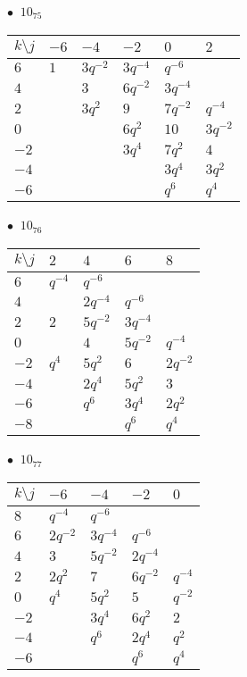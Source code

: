 %
\begin{minipage}{\linewidth}
$\bullet\ $ $10_{75}$ \vspace{0.5em} \\
\begin{tabular}{l|lllll}
$k \setminus j$ & $-6$ & $-4$ & $-2$ & $0$ & $2$ \\
\hline
$6$ & $1$ & $3q^{-2}$ & $3q^{-4}$ & $q^{-6}$ &  \\
$4$ &  & $3$ & $6q^{-2}$ & $3q^{-4}$ &  \\
$2$ &  & $3q^{2}$ & $9$ & $7q^{-2}$ & $q^{-4}$ \\
$0$ &  &  & $6q^{2}$ & $10$ & $3q^{-2}$ \\
$-2$ &  &  & $3q^{4}$ & $7q^{2}$ & $4$ \\
$-4$ &  &  &  & $3q^{4}$ & $3q^{2}$ \\
$-6$ &  &  &  & $q^{6}$ & $q^{4}$ \\
\end{tabular}
\vspace{2em}
\end{minipage}
%
\begin{minipage}{\linewidth}
$\bullet\ $ $10_{76}$ \vspace{0.5em} \\
\begin{tabular}{l|llll}
$k \setminus j$ & $2$ & $4$ & $6$ & $8$ \\
\hline
$6$ & $q^{-4}$ & $q^{-6}$ &  &  \\
$4$ &  & $2q^{-4}$ & $q^{-6}$ &  \\
$2$ & $2$ & $5q^{-2}$ & $3q^{-4}$ &  \\
$0$ &  & $4$ & $5q^{-2}$ & $q^{-4}$ \\
$-2$ & $q^{4}$ & $5q^{2}$ & $6$ & $2q^{-2}$ \\
$-4$ &  & $2q^{4}$ & $5q^{2}$ & $3$ \\
$-6$ &  & $q^{6}$ & $3q^{4}$ & $2q^{2}$ \\
$-8$ &  &  & $q^{6}$ & $q^{4}$ \\
\end{tabular}
\vspace{2em}
\end{minipage}
%
\begin{minipage}{\linewidth}
$\bullet\ $ $10_{77}$ \vspace{0.5em} \\
\begin{tabular}{l|llll}
$k \setminus j$ & $-6$ & $-4$ & $-2$ & $0$ \\
\hline
$8$ & $q^{-4}$ & $q^{-6}$ &  &  \\
$6$ & $2q^{-2}$ & $3q^{-4}$ & $q^{-6}$ &  \\
$4$ & $3$ & $5q^{-2}$ & $2q^{-4}$ &  \\
$2$ & $2q^{2}$ & $7$ & $6q^{-2}$ & $q^{-4}$ \\
$0$ & $q^{4}$ & $5q^{2}$ & $5$ & $q^{-2}$ \\
$-2$ &  & $3q^{4}$ & $6q^{2}$ & $2$ \\
$-4$ &  & $q^{6}$ & $2q^{4}$ & $q^{2}$ \\
$-6$ &  &  & $q^{6}$ & $q^{4}$ \\
\end{tabular}
\vspace{2em}
\end{minipage}
